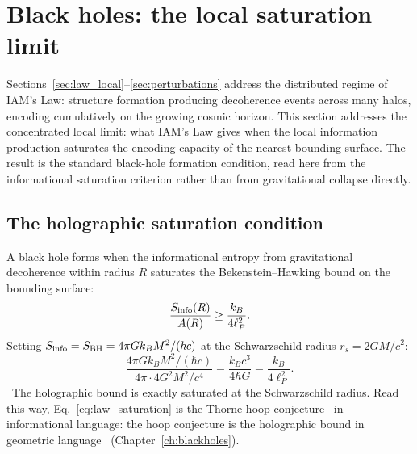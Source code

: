 \section{Black holes: the local saturation limit}\label{sec:law_blackholes}
Sections~\ref{sec:law_local}--\ref{sec:perturbations} address the distributed regime of IAM's Law: structure formation producing decoherence events across
many halos, encoding cumulatively on the growing cosmic horizon. This section addresses the concentrated local limit: what IAM's Law gives when the local
information production saturates the encoding capacity of the nearest bounding surface. The result is the standard black-hole formation condition, read
here from the informational saturation criterion rather than from gravitational collapse directly.

\subsection{The holographic saturation condition}
A black hole forms when the informational entropy from gravitational decoherence within radius $R$ saturates the Bekenstein--Hawking bound on the bounding
surface:
\begin{equation}
\frac{S_{\rm info}(R)}{A(R)}\ge\frac{k_B}{4\ell_P^2}. \label{eq:law_saturation}
\end{equation}
Setting $S_{\rm info}=S_{\rm BH}=4\pi Gk_BM^2/(\hbar c)$ at the Schwarzschild radius $r_s=2GM/c^2$:
\begin{equation}
\frac{4\pi Gk_BM^2/(\hbar c)}{4\pi\cdot4G^2M^2/c^4}=\frac{k_Bc^3}{4\hbar G}=\frac{k_B}{4\ell_P^2}. \label{eq:law_hoop}
\end{equation}
\derived\ The holographic bound is exactly saturated at the Schwarzschild radius. Read this way, Eq.~\eqref{eq:law_saturation} is the Thorne hoop
conjecture~\cite{Thorne1972} in informational language: the hoop conjecture is the holographic bound in geometric language \interp\ (Chapter~\ref{ch:blackholes}).

